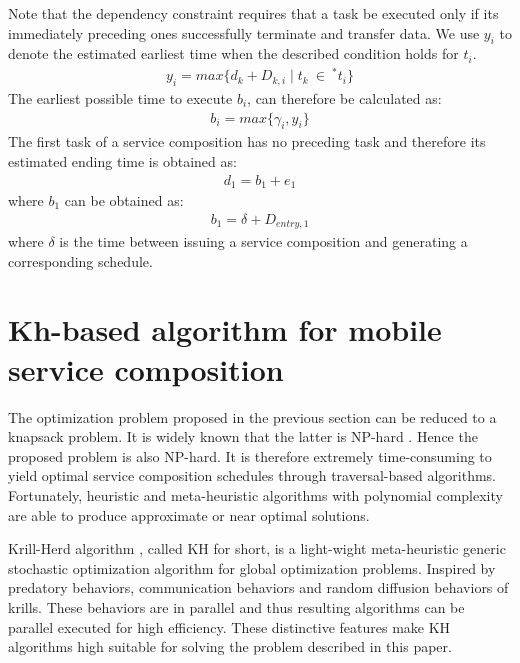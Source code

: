 \documentclass[journal]{IEEEtran}
\begin{document}
Note that the dependency constraint requires that a task be executed only if its immediately preceding ones successfully terminate and transfer data. We use $y_i$ to denote the estimated earliest time when the described condition holds for $t_i$.
\begin{align}
y_i = max \{d_k + D_{k,i} \mid t_k \ \in \ ^{*}t_i \} 
\end{align}
The earliest possible time to execute $b_i$, can therefore be calculated as:
\begin{align}
b_i = max \{ \gamma_i, y_i \}
\end{align}
The first task of a service composition has no preceding task and therefore its estimated ending time is obtained as:
\begin{align}
d_1 = b_1 + e_1
\end{align}
where $b_1$ can be obtained as:
\begin{align}
b_1 = \delta + D_{entry, 1}
\end{align}
where $\delta$ is the time between issuing a service composition and generating a corresponding schedule.

\section{Kh-based algorithm for mobile service composition}

The optimization problem proposed in the previous section can be reduced to a knapsack problem. It is widely known that the latter is NP-hard \cite{papadimitriou1998combinatorial}. Hence the proposed problem is also NP-hard. It is therefore extremely time-consuming to yield optimal service composition schedules through traversal-based algorithms. Fortunately, heuristic and meta-heuristic algorithms with polynomial complexity are able to produce approximate or near optimal solutions.

Krill-Herd algorithm \cite{gandomi2012krill}, called KH for short, is a light-wight meta-heuristic generic stochastic optimization algorithm for global optimization problems. Inspired by predatory behaviors, communication behaviors and random diffusion behaviors of krills. 
These behaviors are in parallel and thus resulting algorithms can be parallel executed for high efficiency. These distinctive features make KH algorithms high suitable for solving the problem described in this paper.
\end{document}
